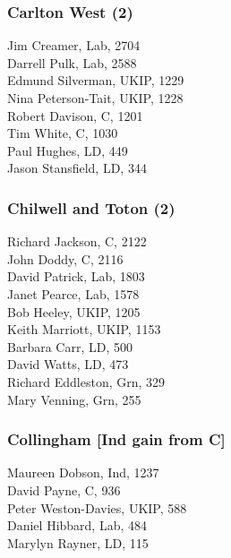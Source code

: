 \documentclass[a4paper,openany,10pt]{book}
\begin{document}
\subsubsection*{Carlton West (2)}



Jim Creamer, Lab, 2704\\
Darrell Pulk, Lab, 2588\\
Edmund Silverman, UKIP, 1229\\
Nina Peterson-Tait, UKIP, 1228\\
Robert Davison, C, 1201\\
Tim White, C, 1030\\
Paul Hughes, LD, 449\\
Jason Stansfield, LD, 344\\


\subsubsection*{Chilwell and Toton (2)}



Richard Jackson, C, 2122\\
John Doddy, C, 2116\\
David Patrick, Lab, 1803\\
Janet Pearce, Lab, 1578\\
Bob Heeley, UKIP, 1205\\
Keith Marriott, UKIP, 1153\\
Barbara Carr, LD, 500\\
David Watts, LD, 473\\
Richard Eddleston, Grn, 329\\
Mary Venning, Grn, 255\\


\subsubsection*{Collingham \hspace*{\fill}\nolinebreak[1]%
\enspace\hspace*{\fill}
[Ind gain from C]}



Maureen Dobson, Ind, 1237\\
David Payne, C, 936\\
Peter Weston-Davies, UKIP, 588\\
Daniel Hibbard, Lab, 484\\
Marylyn Rayner, LD, 115\\
\end{document}
